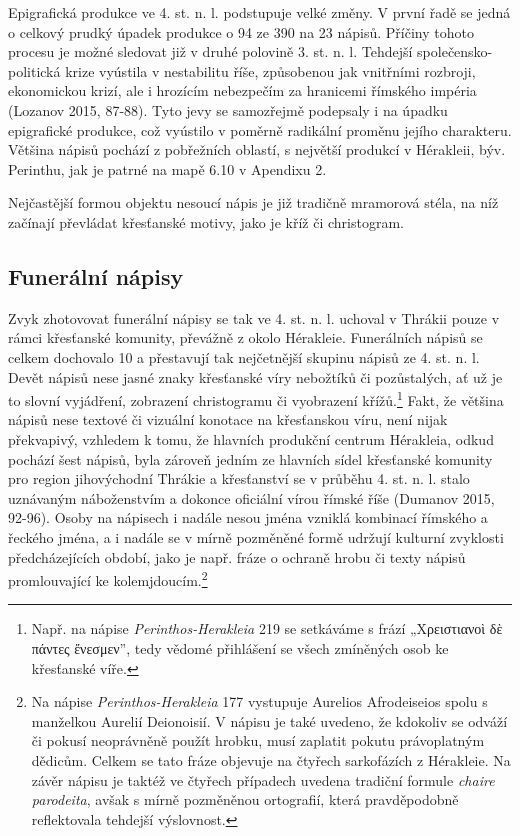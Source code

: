 \NC\AR
\HL
\HL
\stoptable

Epigrafická produkce ve 4. st. n. l. podstupuje velké změny. V první řadě se jedná o celkový prudký úpadek produkce o 94  ze 390 na 23 nápisů. Příčiny tohoto procesu je možné sledovat již v druhé polovině 3. st. n. l. Tehdejší společensko-politická krize vyústila v nestabilitu říše, způsobenou jak vnitřními rozbroji, ekonomickou krizí, ale i hrozícím nebezpečím za hranicemi římského impéria (Lozanov 2015, 87-88). Tyto jevy se samozřejmě podepsaly i na úpadku epigrafické produkce, což vyústilo v poměrně radikální proměnu jejího charakteru. Většina nápisů pochází z pobřežních oblastí, s největší produkcí v Hérakleii, býv. Perinthu, jak je patrné na mapě 6.10 v Apendixu 2.

Nejčastější formou objektu nesoucí nápis je již tradičně mramorová stéla, na níž začínají převládat křesťanské motivy, jako je kříž či christogram.

\subsection[funerální-nápisy-17]{Funerální nápisy}

Zvyk zhotovovat funerální nápisy se tak ve 4. st. n. l. uchoval v Thrákii pouze v rámci křesťanské komunity, převážně z okolo Hérakleie. Funerálních nápisů se celkem dochovalo 10 a přestavují tak nejčetnější skupinu nápisů ze 4. st. n. l. Devět nápisů nese jasné znaky křesťanské víry nebožtíků či pozůstalých, ať už je to slovní vyjádření, zobrazení christogramu či vyobrazení křížů.\footnote{Např. na nápise {\em Perinthos-Herakleia} 219 se setkáváme s frází „Χρειστιανοὶ δὲ πάντες ἔνεσμεν”, tedy vědomé přihlášení se všech zmíněných osob ke křesťanské víře.} Fakt, že většina nápisů nese textové či vizuální konotace na křesťanskou víru, není nijak překvapivý, vzhledem k tomu, že hlavních produkční centrum Hérakleia, odkud pochází šest nápisů, byla zároveň jedním ze hlavních sídel křesťanské komunity pro region jihovýchodní Thrákie a křesťanství se v průběhu 4. st. n. l. stalo uznávaným náboženstvím a dokonce oficiální vírou římské říše (Dumanov 2015, 92-96). Osoby na nápisech i nadále nesou jména vzniklá kombinací římského a řeckého jména, a i nadále se v mírně pozměněné formě udržují kulturní zvyklosti předcházejících období, jako je např. fráze o ochraně hrobu či texty nápisů promlouvající ke kolemjdoucím.\footnote{Na nápise {\em Perinthos-Herakleia} 177 vystupuje Aurelios Afrodeiseios spolu s manželkou Aurelií Deionoisií. V nápisu je také uvedeno, že kdokoliv se odváží či pokusí neoprávněně použít hrobku, musí zaplatit pokutu právoplatným dědicům. Celkem se tato fráze objevuje na čtyřech sarkofázích z Hérakleie. Na závěr nápisu je taktéž ve čtyřech případech uvedena tradiční formule {\em chaire parodeita}, avšak s mírně pozměněnou ortografií, která pravděpodobně reflektovala tehdejší výslovnost.}

